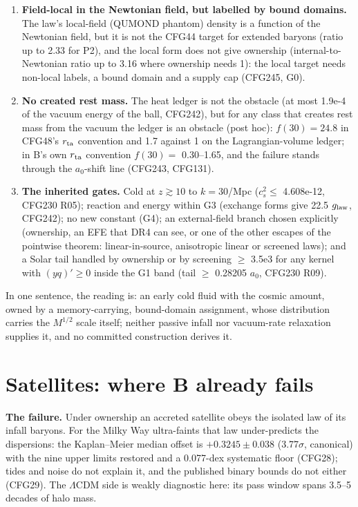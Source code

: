 \documentclass[10pt]{article}
\begin{document}
\begin{enumerate}[label=S\arabic*.]
\item \textbf{Field-local in the Newtonian field, but labelled by bound domains.} The law's local-field (QUMOND phantom) density is a function of the Newtonian field, but it is not the CFG44 target for extended baryons (ratio up to 2.33 for P2), and the local form does not give ownership (internal-to-Newtonian ratio up to 3.16 where ownership needs 1): the local target needs non-local labels, a bound domain and a supply cap (CFG245, G0).
\item \textbf{No created rest mass.} The heat ledger is not the obstacle (at most 1.9e-4 of the vacuum energy of the ball, CFG242), but for any class that creates rest mass from the vacuum the ledger is an obstacle (post hoc): $f(30)=24.8$ in CFG48's $r_{\rm ta}$ convention and 1.7 against 1 on the Lagrangian-volume ledger; in B's own $r_{\rm ta}$ convention $f(30)=$ 0.30--1.65, and the failure stands through the $a_0$-shift line (CFG243, CFG131).
\item \textbf{The inherited gates.} Cold at $z\gtrsim10$ to $k=30$/Mpc ($c_s^2\le$ 4.608e-12, CFG230 R05); reaction and energy within G3 (exchange forms give 22.5 $g_{\rm law}$, CFG242); no new constant (G4); an external-field branch chosen explicitly (ownership, an EFE that DR4 can see, or one of the other escapes of the pointwise theorem: linear-in-source, anisotropic linear or screened laws); and a Solar tail handled by ownership or by screening $\ge$ 3.5e3 for any kernel with $(yq)'\ge0$ inside the G1 band (tail $\ge$ 0.28205 $a_0$, CFG230 R09).
\end{enumerate}
In one sentence, the reading is: an early cold fluid with the cosmic amount, owned by a memory-carrying, bound-domain assignment, whose distribution carries the $M^{1/2}$ scale itself; neither passive infall nor vacuum-rate relaxation supplies it, and no committed construction derives it.

\section{Satellites: where B already fails}\label{sec:sat}

\textbf{The failure.} Under ownership an accreted satellite obeys the isolated law of its infall baryons. For the Milky Way ultra-faints that law under-predicts the dispersions: the Kaplan--Meier median offset is $+0.3245\pm0.038$ (3.77$\sigma$, canonical) with the nine upper limits restored and a 0.077-dex systematic floor (CFG28); tides and noise do not explain it, and the published binary bounds do not either (CFG29). The $\Lambda$CDM side is weakly diagnostic here: its pass window spans 3.5--5 decades of halo mass.
\end{document}
